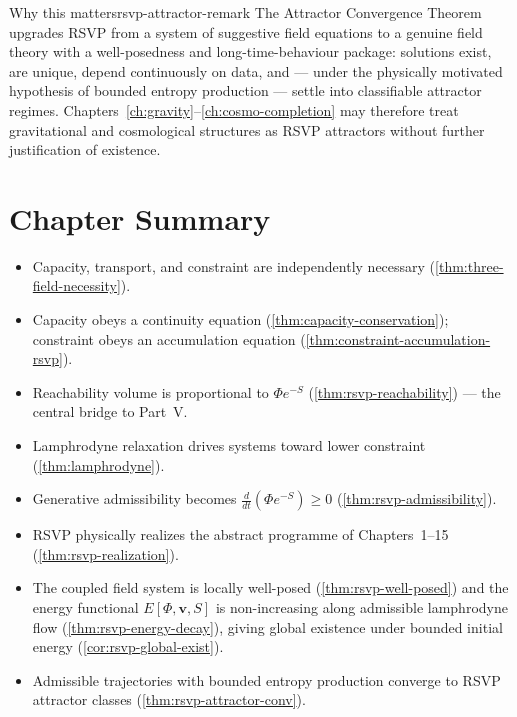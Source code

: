 \documentclass[12pt,twoside,openright]{book}
\newenvironment{chapsummary}{%
  \begin{tcolorbox}[colback=DistBlue!5,colframe=DistBlue,
    title={\faBookOpen\enspace Summary},
    fonttitle=\sffamily\bfseries\color{white},
    attach boxed title to top left={yshift=-2mm,xshift=4mm},
    boxed title style={colback=DistBlue,rounded corners}]
  \begin{itemize}[nosep,leftmargin=*]}{%
  \end{itemize}\end{tcolorbox}}
\begin{document}
\begin{remark}{Why this matters}{rsvp-attractor-remark}
  The Attractor Convergence Theorem upgrades RSVP from a
  system of suggestive field equations to a genuine field
  theory with a well-posedness and long-time-behaviour
  package: solutions exist, are unique, depend continuously
  on data, and --- under the physically motivated hypothesis
  of bounded entropy production --- settle into classifiable
  attractor regimes. Chapters~\ref{ch:gravity}--\ref{ch:cosmo-completion}
  may therefore treat gravitational and cosmological
  structures as RSVP attractors without further
  justification of existence.
\end{remark}

\section*{Chapter Summary}
\begin{chapsummary}
  \item Capacity, transport, and constraint are
        independently necessary
        (\cref{thm:three-field-necessity}).
  \item Capacity obeys a continuity equation
        (\cref{thm:capacity-conservation}); constraint
        obeys an accumulation equation
        (\cref{thm:constraint-accumulation-rsvp}).
  \item Reachability volume is proportional to
        $\Phi e^{-S}$ (\cref{thm:rsvp-reachability}) ---
        the central bridge to Part~V.
  \item Lamphrodyne relaxation drives systems toward lower
        constraint (\cref{thm:lamphrodyne}).
  \item Generative admissibility becomes
        $\frac{d}{dt}(\Phi e^{-S}) \ge 0$
        (\cref{thm:rsvp-admissibility}).
  \item RSVP physically realizes the abstract programme of
        Chapters~1--15 (\cref{thm:rsvp-realization}).
  \item The coupled field system is locally well-posed
        (\cref{thm:rsvp-well-posed}) and the energy
        functional $E[\Phi,\mathbf{v},S]$ is non-increasing
        along admissible lamphrodyne flow
        (\cref{thm:rsvp-energy-decay}), giving global
        existence under bounded initial energy
        (\cref{cor:rsvp-global-exist}).
  \item Admissible trajectories with bounded entropy
        production converge to RSVP attractor classes
        (\cref{thm:rsvp-attractor-conv}).
\end{chapsummary}
\end{document}
